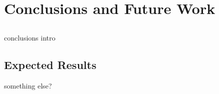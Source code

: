 \chapter{Conclusions and Future Work} \label{chap:concl}

\section*{}

conclusions intro

\section{Expected Results}


\vspace*{12mm}

something else?